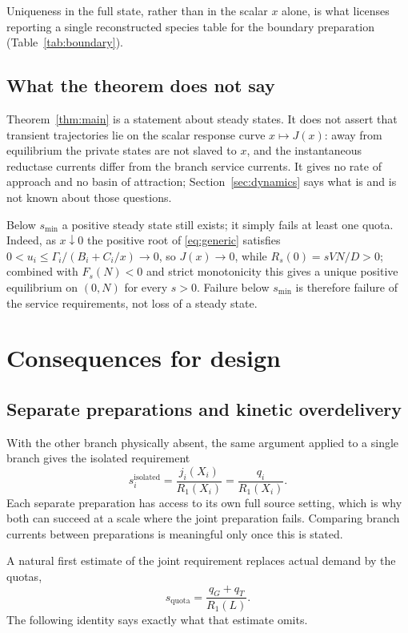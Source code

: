 \documentclass[11pt,a4paper]{article}
\theoremstyle{plain}
\theoremstyle{definition}
\theoremstyle{remark}
\newcommand{\Gm}{\Gamma}
\begin{document}
Uniqueness in the full state, rather than in the scalar $x$ alone, is what
licenses reporting a single reconstructed species table for the boundary
preparation (Table~\ref{tab:boundary}).

\subsection{What the theorem does not say}\label{sec:notsay}

Theorem~\ref{thm:main} is a statement about steady states. It does not assert that
transient trajectories lie on the scalar response curve $x\mapsto J(x)$: away from
equilibrium the private states are not slaved to $x$, and the instantaneous
reductase currents differ from the branch service currents. It gives no rate of
approach and no basin of attraction; Section~\ref{sec:dynamics} says what is and
is not known about those questions.

Below $s_{\min}$ a positive steady state still exists; it simply fails at least
one quota. Indeed, as $x\downarrow0$ the positive root of \eqref{eq:generic}
satisfies $0<u_i\le\Gm_i/(B_i+C_i/x)\to0$, so $J(x)\to0$, while
$R_s(0)=sVN/D>0$; combined with $F_s(N)<0$ and strict monotonicity this gives a
unique positive equilibrium on $(0,N)$ for every $s>0$. Failure below $s_{\min}$
is therefore failure of the service requirements, not loss of a steady state.

\section{Consequences for design}\label{sec:consequences}

\subsection{Separate preparations and kinetic overdelivery}

With the other branch physically absent, the same argument applied to a single
branch gives the isolated requirement
\begin{equation}\label{eq:isolated}
  s_i^{\mathrm{isolated}}=\frac{j_i(X_i)}{R_1(X_i)}=\frac{q_i}{R_1(X_i)} .
\end{equation}
Each separate preparation has access to its own full source setting, which is why
both can succeed at a scale where the joint preparation fails. Comparing branch
currents between preparations is meaningful only once this is stated.

A natural first estimate of the joint requirement replaces actual demand by the
quotas,
\[
  s_{\mathrm{quota}}=\frac{q_G+q_T}{R_1(L)} .
\]
The following identity says exactly what that estimate omits.
\end{document}
